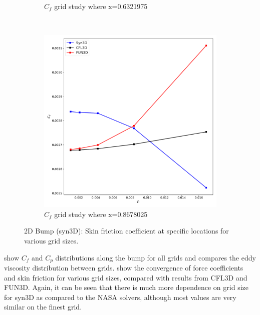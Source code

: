 \begin{figure}[ht!]
\begin{subfigure}{.45\textwidth}
  \caption{$C_f$ grid study where x=0.6321975}
\end{subfigure}
\\
\begin{subfigure}{.45\textwidth}
  \centering
  \includegraphics[width=1.0\textwidth]{figs/2dbump/Cf08678025GridStudy.pdf}
  \caption{$C_f$ grid study where x=0.8678025}
\end{subfigure}%
\caption{2D Bump (syn3D): Skin friction coefficient at specific locations for various grid sizes.}
\label{fig:syn2dbumpcflocstudy}
\end{figure}

 show $C_f$ and $C_p$ distributions along the bump for all grids and  compares the eddy viscosity distribution between grids.  show the convergence of force coefficients and skin friction for various grid sizes, compared with results from CFL3D and FUN3D. Again, it can be seen that there is much more dependence on grid size for syn3D as compared to the NASA solvers, although most values are very similar on the finest grid. 
